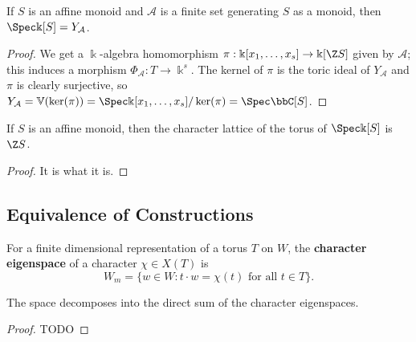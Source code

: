 \begin{proposition}
  \label{1-1-14-spec-aff-mon-alg-eq-ya}

  If $S$ is an affine monoid and $\mathcal A$ is a finite set generating $S$ as a monoid, then $\Spec \Bbbk[S] = Y_{\mathcal A}$.
\end{proposition}
\begin{proof}

  We get a $\Bbbk$-algebra homomorphism $\pi : \Bbbk[x_1, \dotsc, x_s] \to \Bbbk[\Z S]$ given by $\mathcal A$; this induces a morphism $\Phi_{\mathcal A} : T \to \Bbbk^s$. The kernel of $\pi$ is the toric ideal of $Y_{\mathcal A}$ and $\pi$ is clearly surjective, so $Y_{\mathcal A} = \mathbb V(\ker(\pi)) = \Spec \Bbbk[x_1, \dotsc, x_s] / \ker(\pi) = \Spec \bbC[S]$.
\end{proof}


\begin{proposition}
  \label{1-1-14-char-spec-aff-mon-alg}

  If $S$ is an affine monoid, then the character lattice of the torus of $\Spec \Bbbk[S]$ is $\Z S$.
\end{proposition}
\begin{proof}

  It is what it is.
\end{proof}


\subsection{Equivalence of Constructions}


\begin{definition}
  \label{1-1-char-eigenspace}

  For a finite dimensional representation of a torus $T$ on $W$, the {\bf character eigenspace} of a character $\chi \in X(T)$ is
  \[
    W_m = \{w\in W : t\cdot w = \chi(t)\text{ for all } t\in T \}.
  \]
\end{definition}


\begin{proposition}
  \label{1-1-2-char-eigenspace-direct-sum}

  The space decomposes into the direct sum of the character eigenspaces.
\end{proposition}
\begin{proof}
  \uses{}

  TODO
\end{proof}

